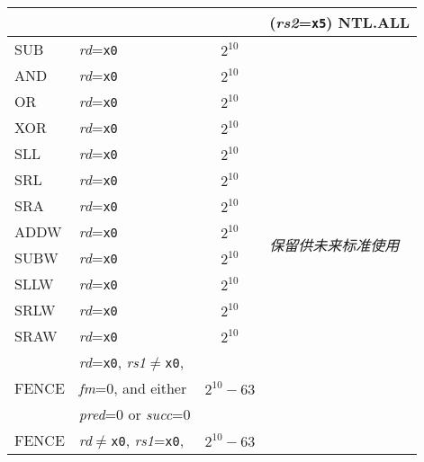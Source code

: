 \begin{table}[hbt]
\begin{tabular}{|l|l|c|l|}
                        &                                             &                             & ({\em rs2}={\tt x5}) NTL.ALL \\ \hline
  SUB                   & {\em rd}={\tt x0}                           & $2^{10}$                    & \multirow{22}{*}{\em 保留供未来标准使用} \\ \cline{1-3}
  AND                   & {\em rd}={\tt x0}                           & $2^{10}$                    & \\ \cline{1-3}
  OR                    & {\em rd}={\tt x0}                           & $2^{10}$                    & \\ \cline{1-3}
  XOR                   & {\em rd}={\tt x0}                           & $2^{10}$                    & \\ \cline{1-3}
  SLL                   & {\em rd}={\tt x0}                           & $2^{10}$                    & \\ \cline{1-3}
  SRL                   & {\em rd}={\tt x0}                           & $2^{10}$                    & \\ \cline{1-3}
  SRA                   & {\em rd}={\tt x0}                           & $2^{10}$                    & \\ \cline{1-3}
  ADDW                  & {\em rd}={\tt x0}                           & $2^{10}$                    & \\ \cline{1-3}
  SUBW                  & {\em rd}={\tt x0}                           & $2^{10}$                    & \\ \cline{1-3}
  SLLW                  & {\em rd}={\tt x0}                           & $2^{10}$                    & \\ \cline{1-3}
  SRLW                  & {\em rd}={\tt x0}                           & $2^{10}$                    & \\ \cline{1-3}
  SRAW                  & {\em rd}={\tt x0}                           & $2^{10}$                    & \\ \cline{1-3}
  \multirow{3}{*}{FENCE}& {\em rd}={\tt x0}, {\em rs1}$\neq${\tt x0}, & \multirow{3}{*}{$2^{10}-63$}& \\
                        & {\em fm}=0, and either                      &                             & \\
                        & {\em pred}=0 or {\em succ}=0                &                             & \\ \cline{1-3}
  \multirow{3}{*}{FENCE}& {\em rd}$\neq${\tt x0}, {\em rs1}={\tt x0}, & \multirow{3}{*}{$2^{10}-63$}& \\

\end{tabular}
\end{table}
